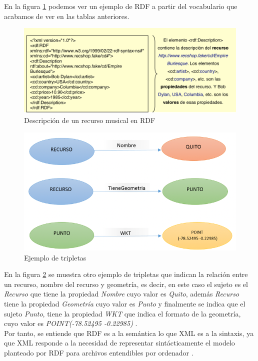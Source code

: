En la figura \ref{fig:ejemplo-rdf} podemos ver un ejemplo de RDF a partir del vocabulario que acabamos de ver en las tablas anteriores.

\begin{figure}[H]
	\centering
	\includegraphics[width=1\linewidth]{imagenes/capitulo3/ejemplo-RDF}
	\caption{Descripción de un recurso musical en RDF \cite{web-semantica-w3c}}
	\label{fig:ejemplo-rdf}
\end{figure}

\begin{figure}[H]
	\centering
	\includegraphics[width=0.75\linewidth]{imagenes/capitulo3/Imagen1}
	\caption{Ejemplo de tripletas \cite{coursera}}
	\label{fig:imagen1}
\end{figure}


En la figura \ref{fig:imagen1} se muestra otro ejemplo de tripletas que indican la relación entre un recurso, nombre del recurso y geometría, es decir, en este caso el sujeto es el \textit{Recurso} que tiene la propiedad \textit{Nombre} cuyo valor es \textit{Quito}, además \textit{Recurso} tiene la propiedad \textit{Geometría} cuyo valor es \textit{Punto} y finalmente se indica que el sujeto \textit{Punto}, tiene la propiedad \textit{WKT} que indica el formato de la geometría, cuyo valor es \textit{POINT(-78.52495 -0.22985)} \cite{coursera}. \\


Por tanto, se entiende que RDF es a la semántica lo que XML es a la sintaxis, ya que XML responde a la necesidad de representar sintácticamente el modelo planteado por RDF para archivos entendibles por ordenador \cite{web-semantica-w3c}.


